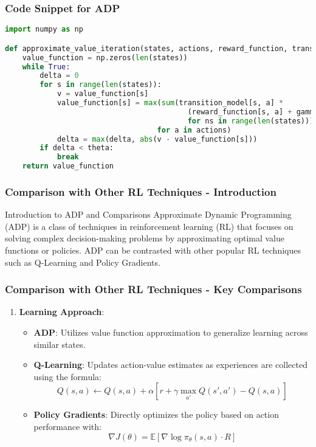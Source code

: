 \documentclass[aspectratio=169]{beamer}
\begin{document}
\begin{frame}[fragile]
    \frametitle{Code Snippet for ADP}
    \begin{lstlisting}[language=Python]
import numpy as np

def approximate_value_iteration(states, actions, reward_function, transition_model, gamma, theta):
    value_function = np.zeros(len(states))
    while True:
        delta = 0
        for s in range(len(states)):
            v = value_function[s]
            value_function[s] = max(sum(transition_model[s, a] * 
                                          (reward_function[s, a] + gamma * value_function[ns]) 
                                          for ns in range(len(states))) 
                                   for a in actions)
            delta = max(delta, abs(v - value_function[s]))
        if delta < theta:
            break
    return value_function
    \end{lstlisting}
\end{frame}

\begin{frame}[fragile]
    \frametitle{Comparison with Other RL Techniques - Introduction}
    \begin{block}{Introduction to ADP and Comparisons}
        Approximate Dynamic Programming (ADP) is a class of techniques in reinforcement learning (RL) that focuses on solving complex decision-making problems by approximating optimal value functions or policies. 
        ADP can be contrasted with other popular RL techniques such as Q-Learning and Policy Gradients.
    \end{block}
\end{frame}

\begin{frame}[fragile]
    \frametitle{Comparison with Other RL Techniques - Key Comparisons}
    \begin{enumerate}
        \item \textbf{Learning Approach}:
            \begin{itemize}
                \item \textbf{ADP}: Utilizes value function approximation to generalize learning across similar states. 
                \item \textbf{Q-Learning}: Updates action-value estimates as experiences are collected using the formula:
                    \begin{equation}
                    Q(s, a) \leftarrow Q(s, a) + \alpha [r + \gamma \max_{a'} Q(s', a') - Q(s, a)]
                    \end{equation}
                \item \textbf{Policy Gradients}: Directly optimizes the policy based on action performance with:
                    \begin{equation}
                    \nabla J(\theta) = \mathbb{E} [ \nabla \log \pi_{\theta}(s, a) \cdot R ]
                    \end{equation}
            \end{itemize}
    \end{enumerate}
\end{frame}
\end{document}
